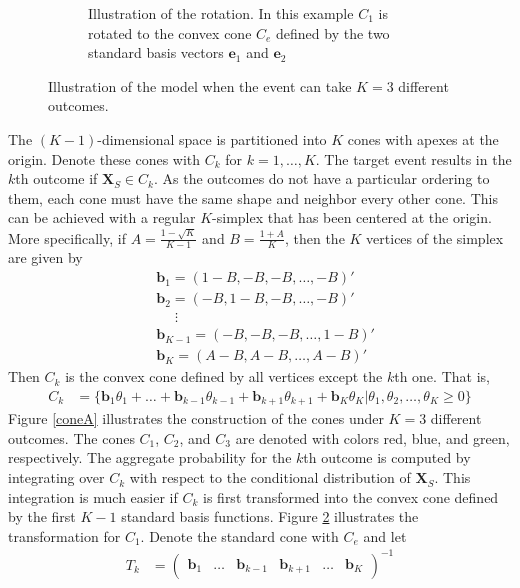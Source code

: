 \documentclass[11pt,twoside]{article}
\theoremstyle{definition}
\theoremstyle{definition}
\begin{document}
\begin{figure}
\begin{subfigure}[b]{0.45\textwidth}
\caption{Illustration of the rotation. In this example $C_1$ is rotated to the convex cone $C_e$ defined by the two standard basis vectors $\boldsymbol{e}_1$ and $\boldsymbol{e}_2$}
\label{coneB}
        \end{subfigure}
        \caption{Illustration of the model when the event can take $K = 3$ different outcomes.}
\end{figure}



The $(K-1)$-dimensional space is partitioned into $K$ cones with apexes at the origin. Denote these cones with $C_k$ for $k = 1, \dots, K$. The target event results in the $k$th outcome if $\boldsymbol{X}_S \in C_k$. As the outcomes do not have a particular ordering to them, each cone must have the same shape and neighbor every other cone. This can be achieved with a regular $K$-simplex that has been centered at the origin. More specifically, if $A = \frac{1- \sqrt{K}}{K-1}$ and $B = \frac{1+A}{K}$, then the $K$ vertices of the simplex are given by 
\begin{align*}
&\boldsymbol{b}_1 = (1-B, -B, -B, \dots, -B)'\\
&\boldsymbol{b}_2 = (-B, 1-B, -B, \dots, -B)'\\
& \phantom{=}\vdots\\
&\boldsymbol{b}_{K-1} = (-B, -B, -B, \dots, 1-B)'\\
&\boldsymbol{b}_{K} = \left(A-B, A-B, \dots, A-B \right)'
\end{align*}
Then $C_k$ is the convex cone defined by all vertices except the $k$th one. That is, 
\begin{align*}
C_k &= \{\boldsymbol{b}_1\theta_1 + \dots + \boldsymbol{b}_{k-1}\theta_{k-1} + \boldsymbol{b}_{k+1}\theta_{k+1} + \boldsymbol{b}_{K}\theta_{K} | \theta_1, \theta_2, \dots, \theta_K \geq 0\} 
\end{align*}
Figure \ref{coneA} illustrates the construction of the cones under $K = 3$ different outcomes. The cones $C_1$, $C_2$, and $C_3$ are denoted with colors red, blue, and green, respectively. The aggregate probability for the $k$th outcome is computed by integrating over $C_k$ with respect to the conditional distribution of $\boldsymbol{X}_S$. This integration is much easier if $C_k$ is first transformed into the convex cone defined by the first $K-1$ standard basis functions. Figure \ref{coneB} illustrates the transformation for $C_1$.  Denote the standard cone with $C_e$ and let 
\begin{align*}
T_k &= \left(\begin{matrix} 
\boldsymbol{b}_1& \dots & \boldsymbol{b}_{k-1} & \boldsymbol{b}_{k+1} & \dots & \boldsymbol{b}_K
 \end{matrix}\right) ^{-1}
\end{align*}
\end{document}
